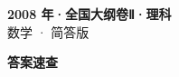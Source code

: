 \documentclass[zihao=-4, a4paper]{ctexart}
\begin{document}
\begin{center}
  {\Large\bfseries 2008 年·全国大纲卷Ⅱ·理科}\\[4pt]
  {\large 数学 · 简答版}
\end{center}
\medskip
{}

\clearpage
{}
\begin{center}{\Large\bfseries 答案速查}\end{center}
\medskip

\end{document}
